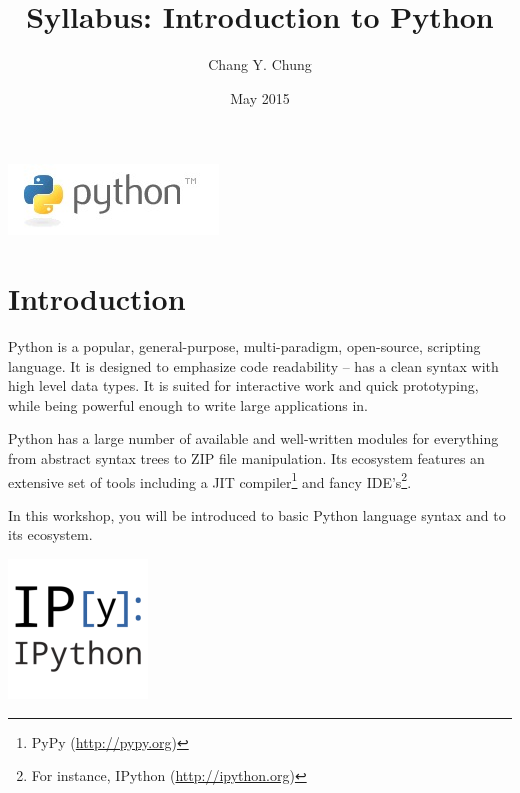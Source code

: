 \documentclass{tufte-handout}
\title{Syllabus: Introduction to Python}
\author{Chang Y. Chung}
\date{May 2015}
\begin{document}
\maketitle

\begin{marginfigure}%
  \includegraphics[width=\linewidth]{python}
  \caption{Python logo from \url{http://www.python.org}. The name is not
    after those dangerous reptiles; it is from the seventies comedy series
    ``Monte Python's Flying Circus''.}
  \label{fig:Python}
\end{marginfigure} 

\section{Introduction}\label{sec:introduction}
Python is a popular, general-purpose, multi-paradigm,
open-source, scripting language. It is designed to emphasize code
readability -- has a clean syntax with high level data types. It is
suited for interactive work and quick prototyping, while being powerful
enough to write large applications in.

Python has a large number of available and well-written modules for
everything from abstract syntax trees to ZIP file manipulation. Its
ecosystem features an extensive set of tools including a JIT
compiler\footnote{PyPy (\url{http://pypy.org})} and fancy
IDE's\footnote{For instance, IPython (\url{http://ipython.org})}.

In this workshop, you will be introduced to basic Python
language syntax and to its ecosystem.

\begin{marginfigure}%
  \includegraphics[width=0.4\linewidth]{ipython}
  \caption{IPython (\url{http://ipython.org}) is a rich architecture for
    interactive computing. Version 3.1 was released on April, 2015.}
  \label{fig:IPython}
\end{marginfigure} 
\end{document}
